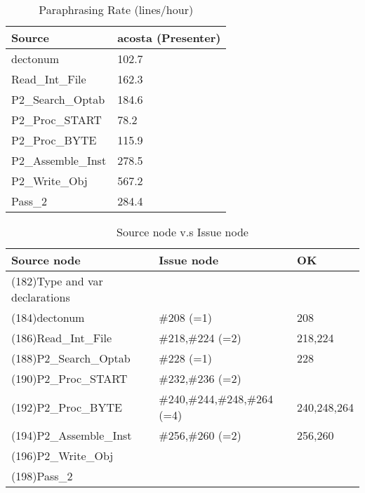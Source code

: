 \begin{table}[hb]
\begin{center}
\begin{tabular}{|l|l|}
\hline
Source & acosta (Presenter)\\
\hline
dectonum & 102.7\\
Read\_Int\_File & 162.3\\
P2\_Search\_Optab & 184.6\\
P2\_Proc\_START & 78.2\\
P2\_Proc\_BYTE & 115.9\\
P2\_Assemble\_Inst & 278.5\\
P2\_Write\_Obj & 567.2\\
Pass\_2 & 284.4\\
\hline
\end{tabular}
\end{center}
\caption{Paraphrasing Rate (lines/hour)}
\end{table}

\begin{table}[hb]
\begin{center}
\begin{tabular}{|l|l|l|}
\hline
Source node & Issue node  & OK\\
\hline
(182)Type and var declarations &  & \\
(184)dectonum & \#208 (=1) & 208\\
(186)Read\_Int\_File & \#218,\#224 (=2) & 218,224\\
(188)P2\_Search\_Optab & \#228 (=1) & 228\\
(190)P2\_Proc\_START & \#232,\#236 (=2) & \\
(192)P2\_Proc\_BYTE & \#240,\#244,\#248,\#264 (=4) & 240,248,264\\
(194)P2\_Assemble\_Inst & \#256,\#260 (=2) & 256,260\\
(196)P2\_Write\_Obj &  & \\
(198)Pass\_2 &  & \\
\hline
\end{tabular}
\caption{Source node v.s Issue node}
\end{center}
\end{table}

